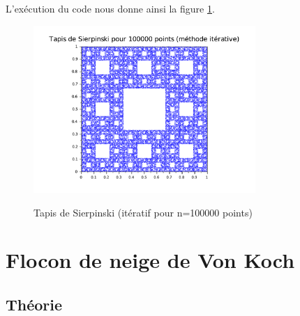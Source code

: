 \documentclass[a4paper,10pt]{report}
\begin{document}
L'exécution du code nous donne ainsi la figure \ref{tapis_it}.
\begin{figure}[H]
\centering
\caption{Tapis de Sierpinski (itératif pour n=100000 points)}
\includegraphics[width=0.75\textwidth]{tapis_iteratif.pdf}
\label{tapis_it}
\end{figure}


\section{Flocon de neige de Von Koch}
\subsection{Théorie}
\end{document}
